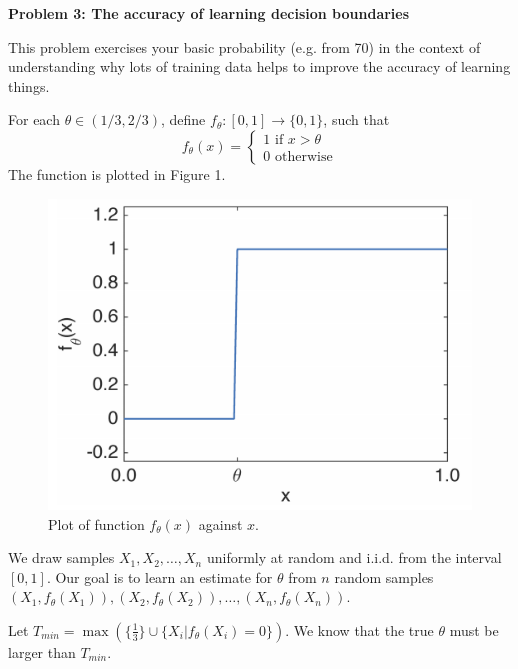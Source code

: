 \documentclass{article}\usepackage[utf8]{inputenc}\usepackage[margin=0.4cm,top=0.4cm,bottom=0.4cm]{geometry}\usepackage[usenames,dvipsnames,svgnames,table]{xcolor}
\begin{document}
\vspace{-2mm}\noindent\begin{mybox}{\begin{center}\textbf{\color{black}Problem 3: The accuracy of learning decision boundaries}\end{center}}\end{mybox}\vspace{-2mm}
\vspace{10pt}
\noindent This problem exercises your basic probability (e.g. from 70) in the context of understanding why lots of training data helps to improve the accuracy of learning things.
\vspace{3pt}

\noindent For each $\theta \in (1/3,2/3)$, define $f_{\theta}: [0,1] \to \{0, 1\}$, such that $$f_\theta(x) =\begin{cases}1 \text{ if } x > \theta \\0 \text{ otherwise}\end{cases}$$
The function is plotted in Figure 1.
\begin{figure}[H]\includegraphics[scale=0.30]{fig1}\caption{Plot of function $f_\theta(x)$ against $x$.}\end{figure}
\noindent We draw samples $X_1, X_2, \ldots, X_n$ uniformly at random and i.i.d. from the interval $[0,1]$. Our goal is to learn an estimate for $\theta$ from $n$ random samples $(X_1, f_{\theta}(X_1)), (X_2, f_{\theta}(X_2)), \ldots, (X_n, f_{\theta}(X_n))$.
\vspace{3pt}

\noindent Let $T_{min} = \max(\{\frac{1}{3}\} \cup \{ X_i | f_\theta(X_i) = 0\})$. We know that the true $\theta$ must be larger than $T_{min}$. 
\vspace{3pt}
\end{document}
